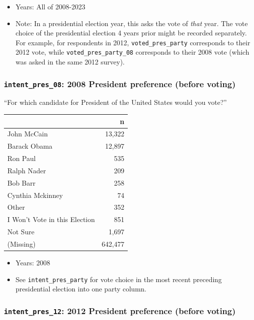 \documentclass[10pt,article,oneside]{memoir}
\theoremstyle{definition}
\begin{document}
\begin{itemize}
\tightlist
\item
  Years: All of 2008-2023
\item
  Note: In a presidential election year, this asks the vote of
  \emph{that} year. The vote choice of the presidential election 4 years
  prior might be recorded separately. For example, for respondents in
  2012, \texttt{voted\_pres\_party} corresponds to their 2012 vote,
  while \texttt{voted\_pres\_party\_08} corresponds to their 2008 vote
  (which was asked in the same 2012 survey).
\end{itemize}

\subsubsection{\texorpdfstring{\texttt{intent\_pres\_08}: 2008 President
preference (before
voting)}{intent\_pres\_08: 2008 President preference (before voting)}}\label{intent_pres_08-2008-president-preference-before-voting}

``For which candidate for President of the United States would you
vote?''

\begin{table}[H]
\centering
\begin{tabular}[t]{lr}
\toprule
 & n\\
\midrule
John McCain & 13,322\\
Barack Obama & 12,897\\
Ron Paul & 535\\
Ralph Nader & 209\\
Bob Barr & 258\\
Cynthia Mckinney & 74\\
Other & 352\\
I Won't Vote in this Election & 851\\
Not Sure & 1,697\\
(Missing) & 642,477\\
\bottomrule
\end{tabular}
\end{table}

\begin{itemize}
\tightlist
\item
  Years: 2008
\item
  See \texttt{intent\_pres\_party} for vote choice in the most recent
  preceding presidential election into one party column.
\end{itemize}

\subsubsection{\texorpdfstring{\texttt{intent\_pres\_12}: 2012 President
preference (before
voting)}{intent\_pres\_12: 2012 President preference (before voting)}}\label{intent_pres_12-2012-president-preference-before-voting}
\end{document}
